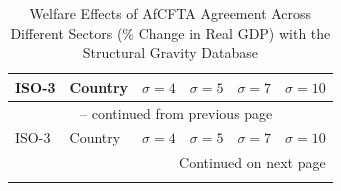 \begin{center}
	\begingroup\footnotesize {}
	\begin{longtable}{llcccc}
		\caption{Welfare Effects of AfCFTA Agreement Across Different Sectors (\% Change in Real GDP) with the Structural Gravity Database \label{table_a_8}} \\
		
		
		\toprule
		\toprule
		ISO-3 & Country & $\sigma = 4$ & $\sigma = 5$ & $\sigma = 7$ & $\sigma = 10$ \\ 
		\toprule
		\endfirsthead
		
		\multicolumn{6}{c}{{\tablename\ \thetable{} -- continued from previous page}} \\ 
		\toprule
		ISO-3 & Country & $\sigma = 4$ & $\sigma = 5$ & $\sigma = 7$ & $\sigma = 10$ \\ 
		\toprule
		\endhead
		
		\bottomrule \multicolumn{6}{r}{{Continued on next page}} \\ 
		\endfoot
		
		\bottomrule
		\bottomrule
		\endlastfoot


\end{longtable}
\end{center}
